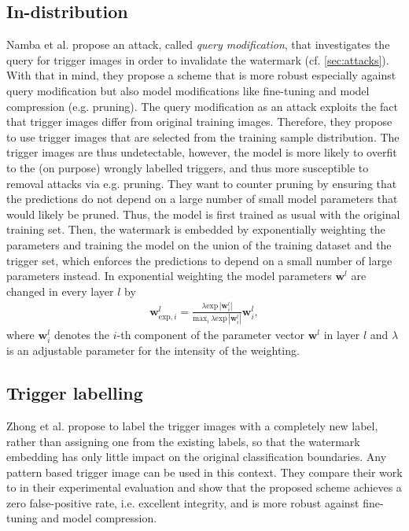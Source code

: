 \subsection{In-distribution}
Namba et al. \cite{namba_robust_2019} propose an attack, called \textit{query modification}, that investigates the query for trigger images in order to invalidate the watermark (cf. \cref{sec:attacks}). With that in mind, they propose a scheme that is more robust especially against query modification but also model modifications like fine-tuning and model compression (e.g. pruning). The query modification as an attack exploits the fact that trigger images differ from original training images. Therefore, they propose to use trigger images that are selected from the training sample distribution.
The trigger images are thus undetectable, however, the model is more likely to overfit to the (on purpose) wrongly labelled triggers, and thus more susceptible to removal attacks via e.g. pruning. They want to counter pruning by ensuring that the predictions do not depend on a large number of small model parameters that would likely be pruned. Thus, the model is first trained as usual with the original training set. Then, the watermark is embedded by exponentially weighting the parameters and training the model on the union of the training dataset and the trigger set, which enforces the predictions to depend on a small number of large parameters instead.
In exponential weighting the model parameters $\mathbf{w}^l$ are changed in every layer $l$ by
\begin{align} \label{eq:exponential-weighting}
     \mathbf{w}_{\mathrm{exp},i}^l = \frac{\lambda \mathrm{exp}\, |\mathbf{w}_i^l|}{\mathrm{max}_i \, \lambda \mathrm{exp} \, |\mathbf{w}_i^l|}\mathbf{w}_i^l,
\end{align} %
where $\mathbf{w}_i^l$ denotes the $i$-th component of the parameter vector $\mathbf{w}^l$ in layer $l$ and $\lambda$ is an adjustable parameter for the intensity of the weighting.

\subsection{Trigger labelling}
Zhong et al. \cite{lauw_protecting_2020} propose to label the trigger images with a completely new label, rather than assigning one from the existing labels, so that the watermark embedding has only little impact on the original classification boundaries.
Any pattern based trigger image can be used in this context. They compare their work to \cite{zhang_protecting_2018} in their experimental evaluation and show that the proposed scheme achieves a zero false-positive rate, i.e. excellent integrity, and is more robust against fine-tuning and model compression.

